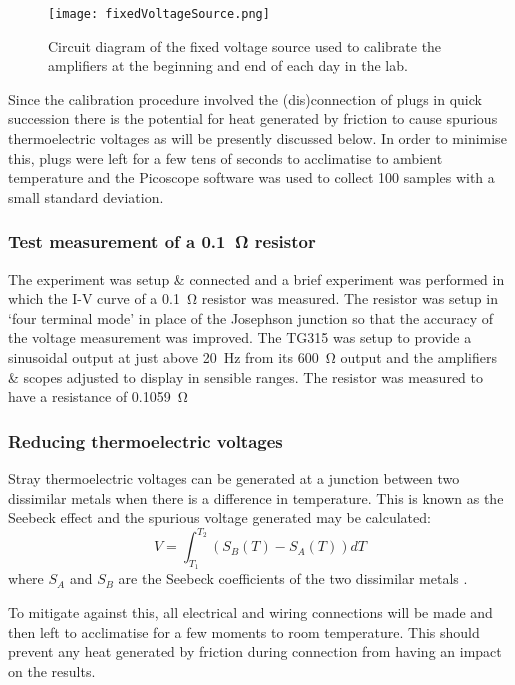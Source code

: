 \documentclass[11pt]{article}
\begin{document}
\begin{figure}[H]
	\centering
	\texttt{[image: fixedVoltageSource.png]}
	\caption{Circuit diagram of the fixed voltage source used to calibrate the amplifiers at the beginning and end of each day in the lab.}
	\label{fixedVoltageSource}
\end{figure}

Since the calibration procedure involved the (dis)connection of plugs in quick succession there is the potential for heat generated by friction to cause spurious thermoelectric voltages as will be presently discussed below. In order to minimise this, plugs were left for a few tens of seconds to acclimatise to ambient temperature and the Picoscope software was used to collect 100 samples with a small standard deviation.

\subsubsection{Test measurement of a \SI{0.1}{\ohm} resistor}
The experiment was setup \& connected and a brief experiment was performed in which the I-V curve of a \SI{0.1}{\ohm} resistor was measured. The resistor was setup in `four terminal mode' in place of the Josephson junction so that the accuracy of the voltage measurement was improved. The TG315 was setup to provide a sinusoidal output at just above \SI{20}{\hertz} from its \SI{600}{\ohm} output and the amplifiers \& scopes adjusted to display in sensible ranges. The resistor was measured to have a resistance of \SI{0.1059}{\ohm}

\subsubsection{Reducing thermoelectric voltages}
Stray thermoelectric voltages can be generated at a junction between two dissimilar metals when there is a difference in temperature. This is known as the Seebeck effect and the spurious voltage generated may be calculated:
\begin{equation}
	\label{SeebeckEffect}
	V = \int_{T_1}^{T_2} (S_B(T) - S_A(T)) dT
\end{equation}
where $S_A$ and $S_B$ are the Seebeck coefficients of the two dissimilar metals \cite{labmanual}.

To mitigate against this, all electrical and wiring connections will be made and then left to acclimatise for a few moments to room temperature. This should prevent any heat generated by friction during connection from having an impact on the results.
\end{document}
